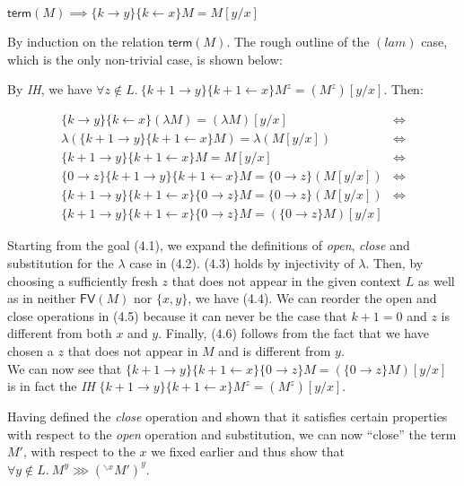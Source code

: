 \documentclass[a4paper, 12pt, twoside]{style/ociamthesis}
\makeatletter
\theoremstyle{plain}
\newtheorem{Lemma}{Lemma}[chapter]
\theoremstyle{definition}
\theoremstyle{remark}
\renewenvironment{proof}[1][\proofname]{\par
  \vspace{-\topsep}%
  \pushQED{\qed}%
  \normalfont
  \topsep0pt \partopsep0pt %
  \trivlist
  \item[\hskip\labelsep
        \itshape
    #1\@addpunct{.}]\ignorespaces
}{%
  \popQED\endtrivlist\@endpefalse
  \addvspace{6pt plus 6pt} %
}
\newcommand{\cls}{{}^{\backslash x}}
\newcommand{\trm}{\textsf{term}}
\newcommand{\fv}{\textsf{FV}}
\renewenvironment{Lemma}{\begin{OldLemma}\begin{mdframed}[style=example, linecolor=cyan]}{\end{mdframed}\end{OldLemma}}
\makeatother
\begin{document}
\begin{Lemma}

\(\trm(M) \implies \{k \to y\}\{k \leftarrow x\} M = M[y/x]\)
\label{Lemma:opnClsSubst}

\begin{proof}

By induction on the relation \(\trm(M)\). The rough outline of the
\((lam)\) case, which is the only non-trivial case, is shown below:

By \emph{IH}, we have
\(\forall z \not\in L.\ \{k+1 \to y\} \{k+1 \leftarrow x\} M^z = (M^z)[y/x]\).
Then:

\begin{align}
\{k \to y\} \{k \leftarrow x\} (\lambda M) = (\lambda M)[y/x] &\iff\\
\lambda(\{k+1 \to y\} \{k+1 \leftarrow x\} M) = \lambda (M[y/x])&\iff\\
\{k+1 \to y\} \{k+1 \leftarrow x\} M = M[y/x]&\iff\\
\{0 \to z\} \{k+1 \to y\} \{k+1 \leftarrow x\} M = \{0 \to z\} (M[y/x])&\iff\\
\{k+1 \to y\} \{k+1 \leftarrow x\} \{0 \to z\} M = \{0 \to z\} (M[y/x])&\iff\\
\{k+1 \to y\} \{k+1 \leftarrow x\} \{0 \to z\} M = (\{0 \to z\} M)[y/x]&
\end{align}

Starting from the goal (4.1), we expand the definitions of \emph{open},
\emph{close} and substitution for the \(\lambda\) case in (4.2). (4.3)
holds by injectivity of \(\lambda\). Then, by choosing a sufficiently
fresh \(z\) that does not appear in the given context \(L\) as well as
in neither \(\fv(M)\) nor \(\{x, y\}\), we have (4.4). We can reorder
the open and close operations in (4.5) because it can never be the case
that \(k+1 = 0\) and \(z\) is different from both \(x\) and \(y\).
Finally, (4.6) follows from the fact that we have chosen a \(z\) that
does not appear in \(M\) and is different from \(y\).\\
We can now see that
\(\{k+1 \to y\} \{k+1 \leftarrow x\} \{0 \to z\} M = (\{0 \to z\} M)[y/x]\)
is in fact the \emph{IH}
\(\{k+1 \to y\} \{k+1 \leftarrow x\} M^z = (M^z)[y/x]\).

\end{proof}

\end{Lemma}

Having defined the \emph{close} operation and shown that it satisfies
certain properties with respect to the \emph{open} operation and
substitution, we can now ``close'' the term \(M'\), with respect to the
\(x\) we fixed earlier and thus show that
\(\forall y \not\in L.\ M^y \ggg (\cls M')^y\).
\end{document}
